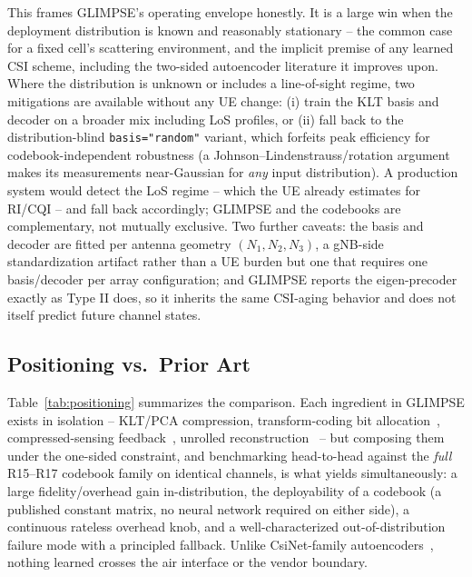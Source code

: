 \documentclass[conference]{IEEEtran}
\begin{document}
This frames GLIMPSE's operating envelope honestly. It is a large win when the deployment distribution is known and reasonably stationary -- the common case for a fixed cell's scattering environment, and the implicit premise of any learned CSI scheme, including the two-sided autoencoder literature it improves upon. Where the distribution is unknown or includes a line-of-sight regime, two mitigations are available without any UE change: (i) train the KLT basis and decoder on a broader mix including LoS profiles, or (ii) fall back to the distribution-blind \texttt{basis="random"} variant, which forfeits peak efficiency for codebook-independent robustness (a Johnson--Lindenstrauss/rotation argument makes its measurements near-Gaussian for \emph{any} input distribution). A production system would detect the LoS regime -- which the UE already estimates for RI/CQI -- and fall back accordingly; GLIMPSE and the codebooks are complementary, not mutually exclusive. Two further caveats: the basis and decoder are fitted per antenna geometry $(N_1,N_2,N_3)$, a gNB-side standardization artifact rather than a UE burden but one that requires one basis/decoder per array configuration; and GLIMPSE reports the eigen-precoder exactly as Type II does, so it inherits the same CSI-aging behavior and does not itself predict future channel states.

\subsection{Positioning vs.\ Prior Art}
Table~\ref{tab:positioning} summarizes the comparison. Each ingredient in GLIMPSE exists in isolation -- KLT/PCA compression, transform-coding bit allocation~\cite{coverthomas2006,gershogray1992}, compressed-sensing feedback~\cite{kuo2012compressive,rao2014distributed}, unrolled reconstruction~\cite{gregorlecun2010} -- but composing them under the one-sided constraint, and benchmarking head-to-head against the \emph{full} R15--R17 codebook family on identical channels, is what yields simultaneously: a large fidelity/overhead gain in-distribution, the deployability of a codebook (a published constant matrix, no neural network required on either side), a continuous rateless overhead knob, and a well-characterized out-of-distribution failure mode with a principled fallback. Unlike CsiNet-family autoencoders~\cite{wen2018csinet,guo2020csinetplus,lu2020crnet,cui2022transnet}, nothing learned crosses the air interface or the vendor boundary.
\end{document}

